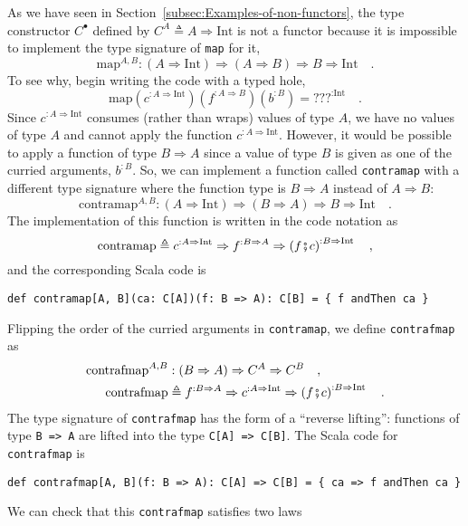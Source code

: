 As we have seen in Section~\ref{subsec:Examples-of-non-functors},
the type constructor $C^{\bullet}$ defined by $C^{A}\triangleq A\Rightarrow\text{Int}$
is not a functor because it is impossible to implement the type signature
of \lstinline!map! for it,
\[
\text{map}^{A,B}:\left(A\Rightarrow\text{Int}\right)\Rightarrow\left(A\Rightarrow B\right)\Rightarrow B\Rightarrow\text{Int}\quad.
\]
To see why, begin writing the code with a typed hole, 
\[
\text{map}(c^{:A\Rightarrow\text{Int}})(f^{:A\Rightarrow B})(b^{:B})=\text{???}^{:\text{Int}}\quad.
\]
Since $c^{:A\Rightarrow\text{Int}}$ consumes (rather than wraps)
values of type $A$, we have no values of type $A$ and cannot apply
the function $c^{:A\Rightarrow\text{Int}}$. However, it would be
possible to apply a function of type $B\Rightarrow A$ since a value
of type $B$ is given as one of the curried arguments, $b^{:B}$.
So, we can implement a function called \lstinline!contramap! with
a different type signature where the function type is $B\Rightarrow A$
instead of $A\Rightarrow B$: 
\[
\text{contramap}^{A,B}:\left(A\Rightarrow\text{Int}\right)\Rightarrow\left(B\Rightarrow A\right)\Rightarrow B\Rightarrow\text{Int}\quad.
\]
The implementation of this function is written in the code notation
as
\[
\text{contramap}\triangleq c^{:A\Rightarrow\text{Int}}\Rightarrow f^{:B\Rightarrow A}\Rightarrow\left(f\bef c\right)^{:B\Rightarrow\text{Int}}\quad,
\]
and the corresponding Scala code is
\begin{lstlisting}
def contramap[A, B](ca: C[A])(f: B => A): C[B] = { f andThen ca }
\end{lstlisting}
Flipping the order of the curried arguments in \lstinline!contramap!,
we define \lstinline!contrafmap! as
\begin{align}
\text{contrafmap}^{A,B} & :\left(B\Rightarrow A\right)\Rightarrow C^{A}\Rightarrow C^{B}\quad,\nonumber \\
\text{contrafmap} & \triangleq f^{:B\Rightarrow A}\Rightarrow c^{:A\Rightarrow\text{Int}}\Rightarrow\left(f\bef c\right)^{:B\Rightarrow\text{Int}}\quad.\label{eq:f-example-1-contrafmap}
\end{align}
The type signature of \lstinline!contrafmap! has the form of a ``reverse
lifting'': functions of type \lstinline!B => A! are lifted into
the type \lstinline!C[A] => C[B]!. The Scala code for \lstinline!contrafmap!
is
\begin{lstlisting}
def contrafmap[A, B](f: B => A): C[A] => C[B] = { ca => f andThen ca } 
\end{lstlisting}
We can check that this \lstinline!contrafmap! satisfies two laws
